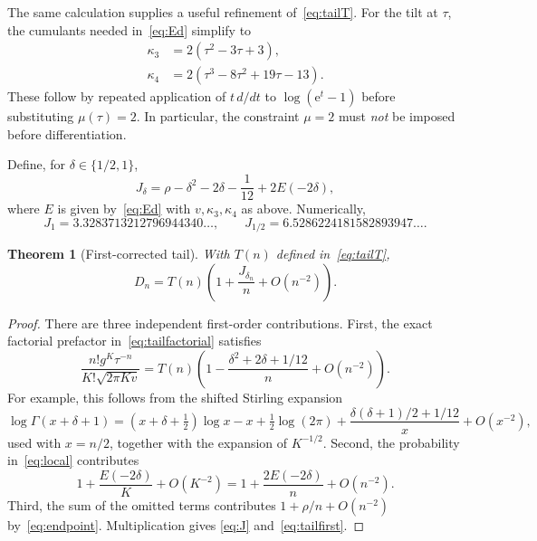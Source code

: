 \documentclass[11pt,a4paper]{article}
\numberwithin{equation}{section}
\newtheorem{theorem}{Theorem}[section]
\theoremstyle{remark}
\newcommand{\e}{\mathrm e}
\begin{document}
The same calculation supplies a useful refinement of~\eqref{eq:tailT}.
For the tilt at $\tau$, the cumulants needed in~\eqref{eq:Ed} simplify to
\begin{align}
 \kappa_3&=2(\tau^2-3\tau+3),\label{eq:kappa3}\\
 \kappa_4&=2(\tau^3-8\tau^2+19\tau-13).\label{eq:kappa4}
\end{align}
These follow by repeated application of $t\,d/dt$ to
$\log(\e^t-1)$ before substituting $\mu(\tau)=2$. In particular, the
constraint $\mu=2$ must \emph{not} be imposed before differentiation.

Define, for $\delta\in\{1/2,1\}$,
\begin{equation}\label{eq:J}
 J_\delta=\rho-\delta^2-2\delta-\frac1{12}+2E(-2\delta),
\end{equation}
where $E$ is given by~\eqref{eq:Ed} with $v,\kappa_3,\kappa_4$ as above.
Numerically,
\begin{equation}\label{eq:Jvalues}
 J_1=3.3283713212796944340\ldots,\qquad
 J_{1/2}=6.5286224181582893947\ldots.
\end{equation}

\begin{theorem}[First-corrected tail]\label{thm:tailcorrected}
With $T(n)$ defined in~\eqref{eq:tailT},
\begin{equation}\label{eq:tailfirst}
 D_n=T(n)\left(1+\frac{J_{\delta_n}}n+O(n^{-2})\right).
\end{equation}
\end{theorem}
\begin{proof}
There are three independent first-order contributions.
First, the exact factorial prefactor in~\eqref{eq:tailfactorial} satisfies
\begin{equation}\label{eq:factorialshift}
 \frac{n!g^K\tau^{-n}}{K!\sqrt{2\pi Kv}}
 =T(n)\left(1-\frac{\delta^2+2\delta+1/12}{n}
             +O(n^{-2})\right).
\end{equation}
For example, this follows from the shifted Stirling expansion
\[
 \log\Gamma(x+\delta+1)
 =(x+\delta+\tfrac12)\log x-x+\tfrac12\log(2\pi)
 +\frac{\delta(\delta+1)/2+1/12}{x}+O(x^{-2}),
\]
used with $x=n/2$, together with the expansion of $K^{-1/2}$.
Second, the probability in~\eqref{eq:local} contributes
\[
 1+\frac{E(-2\delta)}K+O(K^{-2})
 =1+\frac{2E(-2\delta)}n+O(n^{-2}).
\]
Third, the sum of the omitted terms contributes
$1+\rho/n+O(n^{-2})$ by~\eqref{eq:endpoint}. Multiplication gives
\eqref{eq:J} and~\eqref{eq:tailfirst}.
\end{proof}
\end{document}
